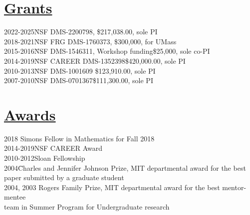 \documentclass[11pt]{amsart}
\theoremstyle{plain}
\theoremstyle{definition}
\theoremstyle{remark}
\begin{document}
\section*{\Large\underline{Grants}}
\begin{tabbing}
  2022-2025\qquad\quad\= NSF DMS-2200798,\quad\quad
\quad\quad\quad\quad\quad\quad\quad\quad\quad\;\$217,038.00, sole PI\\
 2018-2021\qquad\quad\=NSF FRG DMS-1760373, \quad\quad\quad\quad \quad\quad\quad\quad \;  \$300,000,  for UMass\\ 
2015-2016\qquad\quad\=NSF DMS-1546311, Workshop funding\quad\quad\quad \$25,000, sole co-PI\\
2014-2019\qquad\quad\=NSF CAREER DMS-1352398\quad\quad\quad\quad\quad\quad\;\;\;\$420,000.00, sole PI\\
2010-2013\qquad\quad\=NSF DMS-1001609\quad\quad
\quad\quad\quad\quad\quad\quad\quad\quad\quad\;\;\$123,910.00, sole PI\\
2007-2010\qquad\quad\=NSF
DMS-0701367\quad\quad\quad\quad\quad\quad\quad\quad\quad\quad\quad\;\;\$111,300.00, sole PI\\
\end{tabbing}

\section*{\Large\underline{Awards}}
\begin{tabbing}
2018  \quad\quad\quad\quad\quad                  Simons Fellow in Mathematics for Fall 2018 \\
2014-2019\quad\quad\quad NSF CAREER Award\\
2010-2012\quad\quad\quad Sloan Fellowship\\
2004\quad\quad\quad\quad\quad\;\= Charles and Jennifer Johnson
Prize, MIT departmental award
 for the best \\ \>paper submitted by a graduate student\\
2004, 2003\> Rogers Family Prize, MIT departmental award   for the
             best mentor-mentee\\ \>team in Summer Program for
             Undergraduate research\\
\end{tabbing}
\end{document}
